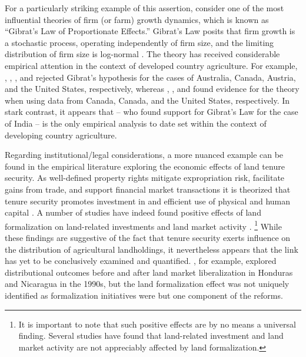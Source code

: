 \documentclass[english]{article}
\begin{document}
For a particularly striking example of this assertion, consider one of the 
most influential theories of firm (or farm) growth dynamics, which is known 
as ``Gibrat's Law of Proportionate Effects.''
Gibrat's Law posits that firm growth is a stochastic process, operating 
independently of firm size, and the limiting distribution of firm size is 
log-normal \citep{gibrat1931, sutton1997}.
The theory has received considerable empirical attention in the context
of developed country agriculture.
For example, \citet{jarrett1968}, \citet{shapiro1987}, \citet{weiss1999}, 
and \citet{melhim2009a} rejected Gibrat's hypothesis for the cases of Australia, 
Canada, Austria, and the United States, respectively, whereas \citet{clark1992}, \citet{fulton1995}, and \citet{melhim2009b} found evidence for the  
theory when using data from Canada, Canada, and the United States, 
respectively.  
In stark contrast, it appears that \citet{shergill1991} -- who found support for 
Gibrat's Law for the case of India -- is the only empirical analysis to date set 
within the context of developing country agriculture.

Regarding institutional/legal considerations, a more nuanced example can be 
found in the empirical literature exploring the economic effects of land 
tenure security.
As well-defined property rights mitigate expropriation risk, facilitate gains 
from trade, and support financial market transactions it is theorized that
tenure security promotes investment in and efficient use of physical and 
human capital \citep{besley2010}.
A number of studies have indeed found positive effects of land formalization 
on land-related investments \citep{feder1988, besley1995, deininger2008} and 
land market activity \citep{deininger2003, boucher2005, deininger2008b}.%
\footnote{It is important to note that such positive effects are by no means
a universal finding. 
Several studies have found that land-related investment \citep{migot1991, 
gavian1996, brasselle2002} and land market activity \citep{deininger2005, 
gould2006, barnes2007} are not appreciably affected by land formalization.}
While these findings are suggestive of the fact that tenure security exerts 
influence on the distribution of agricultural landholdings, it nevertheless 
appears that the link has yet to be conclusively examined and quantified.
\citet{boucher2005}, for example, explored distributional outcomes before 
and after land market liberalization in Honduras and Nicaragua in the 1990s, 
but the land formalization effect was not uniquely identified as formalization 
initiatives were but one component of the reforms.
\end{document}
